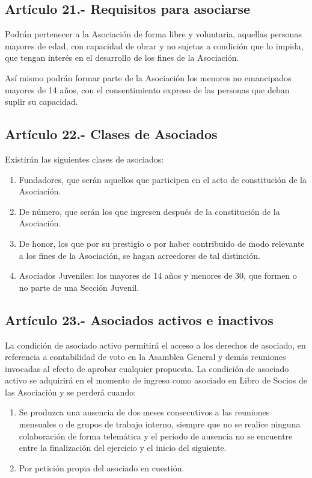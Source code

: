 \documentclass[10pt, spanish, pdftex]{gulplantilla}
\begin{document}
\subsection{Artículo 21.- Requisitos para asociarse}
Podrán pertenecer a la Asociación de forma libre y voluntaria, aquellas personas mayores de edad, con capacidad de obrar y no sujetas a condición que lo impida, que tengan interés en el desarrollo de los fines de la Asociación.

Así mismo podrán formar parte de la Asociación los menores no emancipados mayores de 14 años, con el consentimiento expreso de las personas que deban suplir su capacidad.

\subsection{Artículo 22.- Clases de Asociados}
Existirán las siguientes clases de asociados:
\begin{enumerate}[label=\alph*)]
    \item Fundadores, que serán aquellos que participen en el acto de constitución de la Asociación.
    \item De número, que serán los que ingresen después de la constitución de la Asociación.
    \item De honor, los que por su prestigio o por haber contribuido de modo relevante a los fines de la Asociación, se hagan acreedores de tal distinción.
    \item Asociados Juveniles: los mayores de 14 años y menores de 30, que formen o no parte de una Sección Juvenil.
\end{enumerate}

\subsection{Artículo 23.- Asociados activos e inactivos}
La condición de asociado activo permitirá el acceso a los derechos de asociado, en referencia a contabilidad de voto en la Asamblea General y demás reuniones invocadas al efecto de aprobar cualquier propuesta. La condición de asociado activo se adquirirá en el momento de ingreso como asociado en Libro de Socios de las Asociación y se perderá cuando:
\begin{enumerate}[label=\alph*)]
    \item Se produzca una ausencia de dos meses consecutivos a las reuniones mensuales o de grupos de trabajo interno, siempre que no se realice ninguna colaboración de forma telemática y el período de ausencia no se encuentre entre la finalización del ejercicio y el inicio del siguiente.
    \item Por petición propia del asociado en cuestión.
\end{enumerate}
\end{document}
